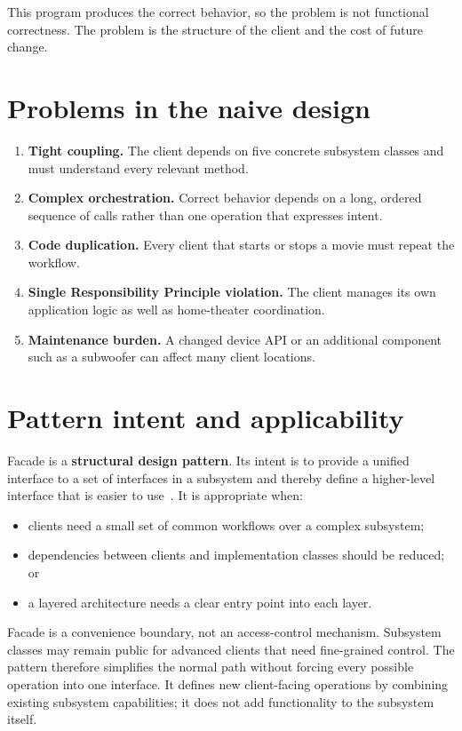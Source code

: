 \documentclass[11pt,a4paper]{report}
\begin{document}
This program produces the correct behavior, so the problem is not functional
correctness. The problem is the structure of the client and the cost of future
change.

\section{Problems in the naive design}
\begin{enumerate}
  \item \textbf{Tight coupling.} The client depends on five concrete subsystem
  classes and must understand every relevant method.
  \item \textbf{Complex orchestration.} Correct behavior depends on a long,
  ordered sequence of calls rather than one operation that expresses intent.
  \item \textbf{Code duplication.} Every client that starts or stops a movie
  must repeat the workflow.
  \item \textbf{Single Responsibility Principle violation.} The client manages
  its own application logic as well as home-theater coordination.
  \item \textbf{Maintenance burden.} A changed device API or an additional
  component such as a subwoofer can affect many client locations.
\end{enumerate}

\section{Pattern intent and applicability}
Facade is a \textbf{structural design pattern}. Its intent is to provide a
unified interface to a set of interfaces in a subsystem and thereby define a
higher-level interface that is easier to use~\cite{gof}. It is appropriate when:
\begin{itemize}
  \item clients need a small set of common workflows over a complex subsystem;
  \item dependencies between clients and implementation classes should be
  reduced; or
  \item a layered architecture needs a clear entry point into each layer.
\end{itemize}

Facade is a convenience boundary, not an access-control mechanism. Subsystem
classes may remain public for advanced clients that need fine-grained control.
The pattern therefore simplifies the normal path without forcing every possible
operation into one interface. It defines new client-facing operations by
combining existing subsystem capabilities; it does not add functionality to the
subsystem itself.
\end{document}
